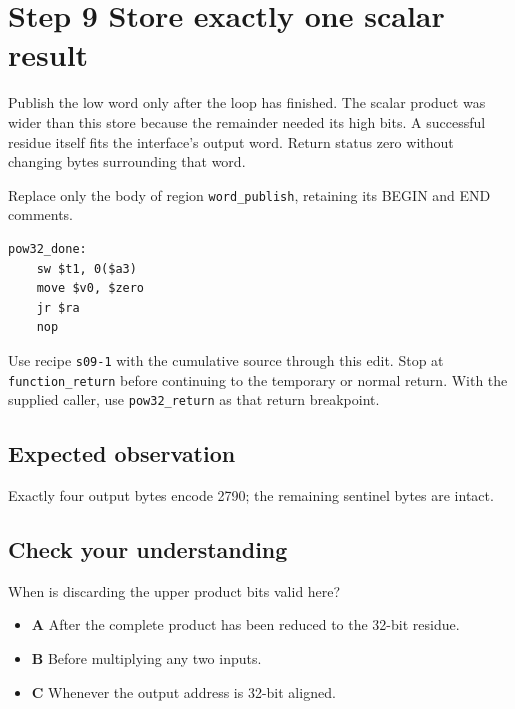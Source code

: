 \section{Step 9 Store exactly one scalar result}\label{rsa-s09}

Publish the low word only after the loop has finished. The scalar product was wider than this store because the remainder needed its high bits. A successful residue itself fits the interface's output word. Return status zero without changing bytes surrounding that word.

Replace only the body of region \texttt{word\_publish}, retaining its BEGIN and END comments.

\begin{verbatim}
pow32_done:
    sw $t1, 0($a3)
    move $v0, $zero
    jr $ra
    nop
\end{verbatim}

Use recipe \texttt{s09-1} with the cumulative source through this edit. Stop at \texttt{function\_return} before continuing to the temporary or normal return. With the supplied caller, use \texttt{pow32\_return} as that return breakpoint.

\subsection{Expected observation}
Exactly four output bytes encode 2790; the remaining sentinel bytes are intact.

\subsection{Check your understanding}
When is discarding the upper product bits valid here?

\begin{itemize}
\item \textbf{A} After the complete product has been reduced to the 32-bit residue.
\item \textbf{B} Before multiplying any two inputs.
\item \textbf{C} Whenever the output address is 32-bit aligned.
\end{itemize}
